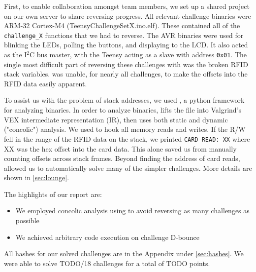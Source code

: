 First, to enable collaboration amongst team members, we set up a \ghidra shared
project on our own server to share reversing progress.
All relevant challenge binaries were ARM-32 Cortex-M4 (TeensyChallengeSetX.ino.elf).
These contained all of the \texttt{challenge\_X} functions that we had to reverse.
The AVR binaries were used for blinking the LEDs, polling the buttons, and displaying to the LCD. It also acted as the I$^{2}$C bus master, with the Teensy acting as a slave with address \texttt{0x01}.
The single most
difficult part of reversing these challenges with \ghidra was the broken RFID
stack variables. \ghidra was unable, for nearly all challenges, to make the
offsets into the RFID data easily apparent.

To assist us with the problem of stack addresses, we used \angr, a python framework for analyzing binaries. In order to analyze binaries, \angr lifts the file into Valgrind's VEX intermediate representation (IR), then uses both static and dynamic ("concolic") analysis. We used \angr to hook all memory reads and writes. If the R/W fell in the range of the RFID
data on the stack, we printed \texttt{CARD READ: XX} where XX was the hex
offset into the card data. This alone saved us from manually counting offsets
across stack frames. Beyond finding the address of card reads, \angr allowed us to automatically solve many of the simpler challenges. More details are shown in \autoref{sec:lounge}.

\vspace{0.5cm}
\noindent The highlights of our report are:
\begin{itemize}
  \item We employed concolic analysis using \angr to avoid reversing as many challenges as possible
  \item We achieved arbitrary code execution on challenge \mbox{D-bounce}
\end{itemize}

All hashes for our solved challenges are in the Appendix under \autoref{sec:hashes}.
We were able to solve TODO/18 challenges for a total of TODO points.



